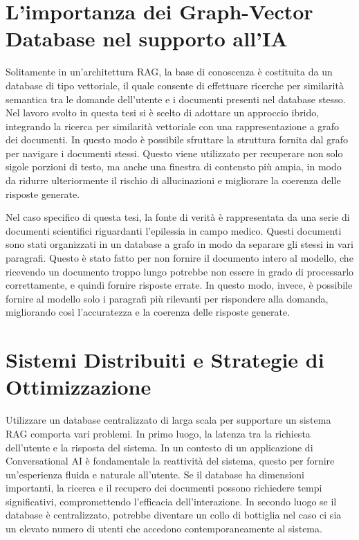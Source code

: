 \section*{L'importanza dei Graph-Vector Database nel supporto all'IA}

Solitamente in un'architettura RAG, la base di conoscenza è costituita da un database di tipo vettoriale, il quale consente di effettuare ricerche per similarità semantica tra le domande dell'utente e i documenti presenti nel database stesso. Nel lavoro svolto in questa tesi si è scelto di adottare un approccio ibrido, integrando la ricerca per similarità vettoriale con una rappresentazione a grafo dei documenti. In questo modo è possibile sfruttare la struttura fornita dal grafo per navigare i documenti stessi. Questo viene utilizzato per recuperare non solo sigole porzioni di testo, ma anche una finestra di contensto più ampia, in modo da ridurre ulteriormente il rischio di allucinazioni e migliorare la coerenza delle risposte generate.

Nel caso specifico di questa tesi, la fonte di verità è rappresentata da una serie di documenti scientifici riguardanti l'epilessia in campo medico. Questi documenti sono stati organizzati in un database a grafo in modo da separare gli stessi in vari paragrafi. Questo è stato fatto per non fornire il documento intero al modello, che ricevendo un documento troppo lungo potrebbe non essere in grado di processarlo correttamente, e quindi fornire risposte errate. In questo modo, invece, è possibile fornire al modello solo i paragrafi più rilevanti per rispondere alla domanda, migliorando così l'accuratezza e la coerenza delle risposte generate.

\section*{Sistemi Distribuiti e Strategie di Ottimizzazione}

Utilizzare un database centralizzato di larga scala per supportare un sistema RAG comporta vari problemi. In primo luogo, la latenza tra la richiesta dell'utente e la risposta del sistema. In un contesto di un applicazione di Conversational AI è fondamentale la reattività del sistema, questo per fornire un'esperienza fluida e naturale all'utente. Se il database ha dimensioni importanti, la ricerca e il recupero dei documenti possono richiedere tempi significativi, compromettendo l'efficacia dell'interazione. In secondo luogo se il database è centralizzato, potrebbe diventare un collo di bottiglia nel caso ci sia un elevato numero di utenti che accedono contemporaneamente al sistema.

